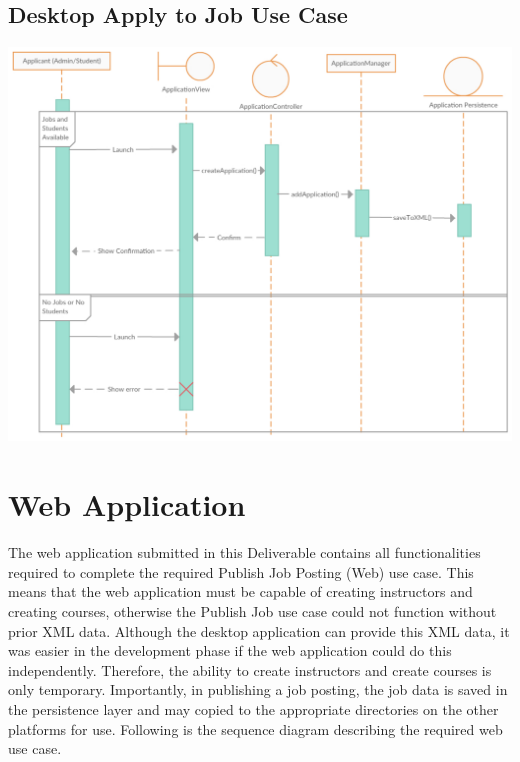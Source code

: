 \documentclass[12pt]{report}
\begin{document}
\subsection{Desktop Apply to Job Use Case}
\includegraphics[scale=0.73]{model/SEQUENCE/apply_desktopSequence}

\section{Web Application}
The web application submitted in this Deliverable contains all functionalities required to complete
the required Publish Job Posting (Web) use case. This means that the web application must be capable
of creating instructors and creating courses, otherwise the Publish Job use case could not function
without prior XML data. Although the desktop application can provide this XML data, it was easier in
the development phase if the web application could do this independently. Therefore, the ability to
create instructors and create courses is only temporary. Importantly, in publishing a job posting,
the job data is saved in the persistence layer and may copied to the appropriate directories on the
other platforms for use. Following is the sequence diagram describing the required web use case.
\end{document}
